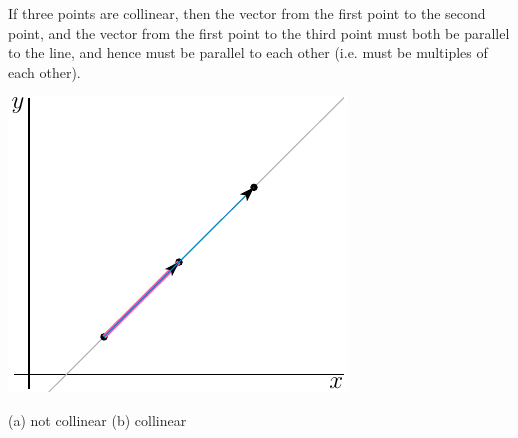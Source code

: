 \begin{hint}
If three points are collinear, then the vector from the first point
to the second point, and the vector from the first point to the third point 
must both be parallel to the line, and hence must be parallel to each other
(i.e. must be multiples of each other).

\begin{center}
     \includegraphics{fig/collinear.pdf}
\end{center}

\end{hint}

\begin{answer}
(a) not collinear\qquad
(b) collinear
\end{answer}

